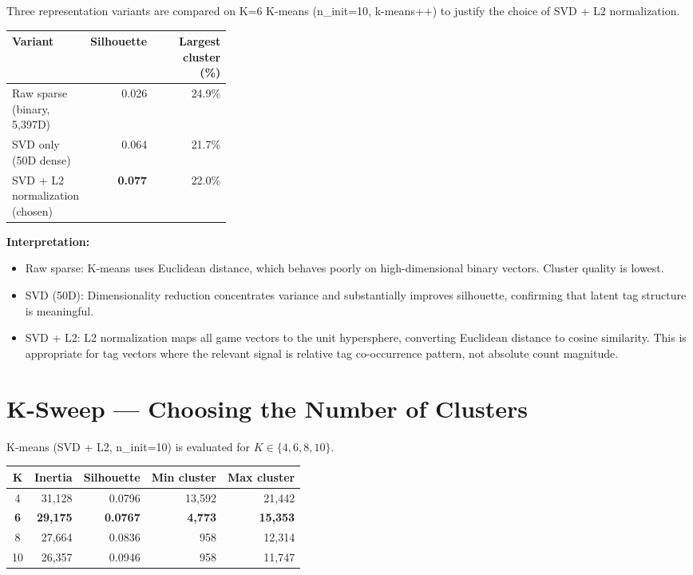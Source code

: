 \documentclass[11pt,a4paper]{article}
\begin{document}
Three representation variants are compared on K=6 K-means (n\_init=10, k-means++) to justify the choice of SVD + L2 normalization.

\begin{longtable}{p{0.32\linewidth}rr}
\toprule
\textbf{Variant} & \textbf{Silhouette} & \textbf{Largest cluster (\%)} \\
\midrule
Raw sparse (binary, 5,397D) & 0.026 & 24.9\% \\
SVD only (50D dense) & 0.064 & 21.7\% \\
SVD + L2 normalization (chosen) & \textbf{0.077} & 22.0\% \\
\bottomrule
\end{longtable}

\textbf{Interpretation:}
\begin{itemize}[leftmargin=*]
  \item Raw sparse: K-means uses Euclidean distance, which behaves poorly on high-dimensional binary vectors. Cluster quality is lowest.
  \item SVD (50D): Dimensionality reduction concentrates variance and substantially improves silhouette, confirming that latent tag structure is meaningful.
  \item SVD + L2: L2 normalization maps all game vectors to the unit hypersphere, converting Euclidean distance to cosine similarity. This is appropriate for tag vectors where the relevant signal is relative tag co-occurrence pattern, not absolute count magnitude.
\end{itemize}

\section{K-Sweep --- Choosing the Number of Clusters}

K-means (SVD + L2, n\_init=10) is evaluated for $K \in \{4, 6, 8, 10\}$.

\begin{longtable}{crrrr}
\toprule
\textbf{K} & \textbf{Inertia} & \textbf{Silhouette} & \textbf{Min cluster} & \textbf{Max cluster} \\
\midrule
4 & 31,128 & 0.0796 & 13,592 & 21,442 \\
\textbf{6} & \textbf{29,175} & \textbf{0.0767} & \textbf{4,773} & \textbf{15,353} \\
8 & 27,664 & 0.0836 & 958 & 12,314 \\
10 & 26,357 & 0.0946 & 958 & 11,747 \\
\bottomrule
\end{longtable}
\end{document}
